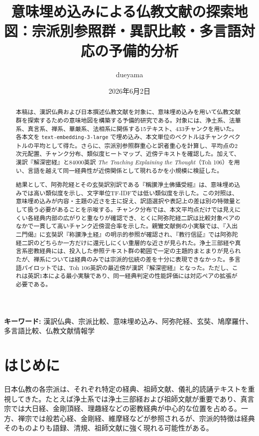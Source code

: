\documentclass[uplatex,dvipdfmx,11pt,a4paper]{jsarticle}
\title{意味埋め込みによる仏教文献の探索地図：宗派別参照群・異訳比較・多言語対応の予備的分析}
\author{dueyama}
\date{2026年6月2日}
\begin{document}
\maketitle

\begin{abstract}
本稿は、漢訳仏典および日本撰述仏教文献を対象に、意味埋め込みを用いて仏教文献群を探索するための意味地図を構築する予備的研究である。対象には、浄土系、法華系、真言系、禅系、華厳系、法相系に関係する15テキスト、433チャンクを用いた。各本文を \texttt{text-embedding-3-large} で埋め込み、本文単位のベクトルはチャンクベクトルの平均として得た。さらに、宗派別参照群重心と訳者重心を計算し、平均点の2次元配置、チャンク分布、類似度ヒートマップ、近傍テキストを確認した。加えて、漢訳『解深密経』と84000英訳 \textit{The Teaching Explaining the Thought}（Toh 106）を用い、言語を越えて同一経典性が近傍関係として現れるかを小規模に検証した。

結果として、阿弥陀経とその玄奘訳別訳である『稱讃淨土佛攝受經』は、意味埋め込みでは高い類似度を示し、文字単位TF-IDFでは低い類似度を示した。この対照は、意味埋め込みが内容・主題の近さを主に捉え、訳語選択や表記上の差は別の特徴量として扱う必要があることを示唆する。チャンク分布では、本文平均点だけでは見えにくい各経典内部の広がりと重なりが確認でき、とくに阿弥陀経二訳は比較対象ペアのなかで一貫して高いチャンク近傍混合率を示した。親鸞文献側の小実験では、『入出二門偈』に玄奘訳『称讃浄土経』の明示的参照が確認され、『教行信証』では阿弥陀経二訳のどちらか一方だけに還元しにくい重層的な近さが見られた。浄土三部経や真言系密教経典には、投入した参照テキスト群の範囲で一定の主題的まとまりが見られたが、禅系については経典のみでは宗派的伝統の差を十分に表現できなかった。多言語パイロットでは、Toh 106英訳の最近傍が漢訳『解深密経』となった。ただし、これは英訳1本による最小実験であり、同一経典判定の性能評価には対応ペアの拡張が必要である。
\end{abstract}

\noindent\textbf{キーワード:} 漢訳仏典、宗派比較、意味埋め込み、阿弥陀経、玄奘、鳩摩羅什、多言語比較、仏教文献情報学

\section{はじめに}

日本仏教の各宗派は、それぞれ特定の経典、祖師文献、儀礼的読誦テキストを重視してきた。たとえば浄土系では浄土三部経および祖師文献が重要であり、真言宗では大日経、金剛頂経、理趣経などの密教経典が中心的な位置を占める。一方、禅宗では般若心経、金剛経、維摩経などが参照されるが、宗派的特徴は経典そのものよりも語録、清規、祖師文献に強く現れる可能性がある。
\end{document}
